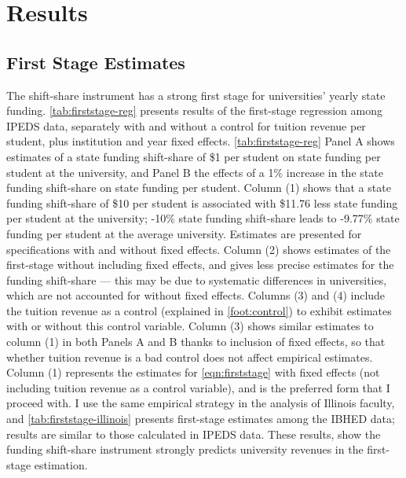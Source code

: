 \section{Results}
\label{sec:results}

\subsection{First Stage Estimates}
The shift-share instrument has a strong first stage for universities' yearly state funding.
\autoref{tab:firststage-reg} presents results of the first-stage regression among IPEDS data, separately with and without a control for tuition revenue per student, plus institution and year fixed effects.
\autoref{tab:firststage-reg} Panel A shows estimates of a state funding shift-share of \$1 per student on state funding per student at the university, and Panel B the effects of a 1\% increase in the state funding shift-share on state funding per student.
Column (1) shows that a state funding shift-share of \$10 per student is associated with \$11.76 less state funding per student at the university; -10\% state funding shift-share leads to -9.77\% state funding per student at the average university.
Estimates are presented for specifications with and without fixed effects.
Column (2) shows estimates of the first-stage without including fixed effects, and gives less precise estimates for the funding shift-share --- this may be due to systematic differences in universities, which are not accounted for without fixed effects.
Columns (3) and (4) include the tuition revenue as a control (explained in \autoref{foot:control}) to exhibit estimates with or without this control variable.
Column (3) shows similar estimates to column (1) in both Panels A and B thanks to inclusion of fixed effects, so that 
whether tuition revenue is a bad control does not affect empirical estimates.
Column (1) represents the estimates for \autoref{eqn:firststage} with fixed effects (not including tuition revenue as a control variable), and is the preferred form that I proceed with.
I use the same empirical strategy in the analysis of Illinois faculty, and \autoref{tab:firststage-illinois} presents first-stage estimates among the IBHED data; results are similar to those calculated in IPEDS data.
These results, show the funding shift-share instrument strongly predicts university revenues in the first-stage estimation.

